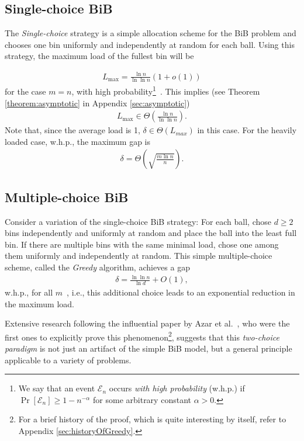 \documentclass[a4paper,12pt]{article}
\newcommand\load{L_{\mathrm{max}}}
\begin{document}
\subsection{Single-choice BiB}
\label{sec:single-choice}
The \emph{Single-choice} strategy is a simple allocation scheme for the BiB problem and chooses one bin uniformly and independently at random for each ball. Using this strategy, the maximum load of the fullest bin will be
\begin{comment}
\footnote{A more accurate result exists: The maximum load is $\load = \Gamma^{-1}\left(n\right)\left(1+O\left(\frac{1}{\log \Gamma^{-1}\left(n\right)}\right)\right)$~\cite{G91}.}
\end{comment}
\begin{align*}
\load = \frac{\ln n}{\ln \ln n}  \left(1 + o\left(1\right)\right)
\end{align*}
for the case $m=n$, with high probability\footnote{We say that an event $\mathcal E_n$ occurs \emph{with high probability} (w.h.p.) if $\Pr\left[\mathcal E_n \right] \geq 1 - n^{-\alpha}$ for some arbitrary constant $\alpha > 0$.}~\cite{RS98}. This implies (see Theorem \ref{theorem:asymptotic} in Appendix \ref{sec:asymptotic})
\begin{align*}
\load\in \Theta\left(\frac{\ln n}{\ln \ln n}\right).
\end{align*}
Note that, since the average load is 1, $\delta \in \Theta\left( L_{max} \right)$ in this case. For the heavily loaded case, w.h.p., the maximum gap is ~\cite{RS98}
\begin{align*}
\delta = \Theta\left(\sqrt{\frac{m  \ln n}{n}}\right).
\end{align*}

\subsection{Multiple-choice BiB}
Consider a variation of the  single-choice BiB strategy: For each ball, chose $d \geq 2$ bins independently and uniformly at random and place the ball into the least full bin. If there are multiple bins with the same minimal load, chose one among them uniformly and independently at random. This simple multiple-choice scheme, called the \emph{Greedy} algorithm, achieves a gap
\begin{align*}
\delta = \frac{\ln \ln n}{\ln d} + O(1),
\end{align*}
w.h.p., for all $m$~\cite{ABKU99, BCSV06}, i.e., this additional choice leads to an exponential reduction in the maximum load. 
\begin{comment}
Curiously, the exponential decrease in the gap is already achieved having just two choices (that is, $d=2$). Each additional choice decreases the bound for the maximum gap by just a constant factor~\cite{MRS01}. 
\end{comment}
Extensive research following the influential paper by Azar et al.~\cite{ABKU99}, who were the first ones to explicitly prove this phenomenon\footnote{For a brief history of the proof, which is quite interesting by itself, refer to Appendix \ref{sec:historyOfGreedy}.}, suggests that this \emph{two-choice paradigm} is not just an artifact of the simple BiB model, but a general principle applicable to a variety of problems. 
\end{document}
